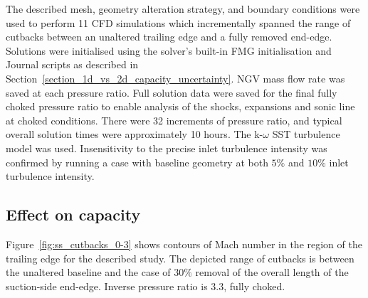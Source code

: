 \documentclass[a4paper, 11pt, oneside]{report}
\begin{document}
The described mesh, geometry alteration strategy, and boundary conditions were used to perform 11 CFD simulations which incrementally spanned the range of cutbacks between an unaltered trailing edge and a fully removed end-edge. Solutions were initialised using the solver's built-in FMG initialisation and Journal scripts as described in Section~\ref{section_1d_vs_2d_capacity_uncertainty}. NGV mass flow rate was saved at each pressure ratio. Full solution data were saved for the final fully choked pressure ratio to enable analysis of the shocks, expansions and sonic line at choked conditions. There were 32 increments of pressure ratio, and typical overall solution times were approximately 10 hours. The k-$\omega$ SST turbulence model was used. Insensitivity to the precise inlet turbulence intensity was confirmed by running a case with baseline geometry at both $5\%$ and $10\%$ inlet turbulence intensity.

\subsection{Effect on capacity}

Figure~\ref{fig:ss_cutbacks_0-3} shows contours of Mach number in the region of the trailing edge for the described study. The depicted range of cutbacks is between the unaltered baseline and the case of $30\%$ removal of the overall length of the suction-side end-edge. Inverse pressure ratio is $3.3$, fully choked.
\end{document}

